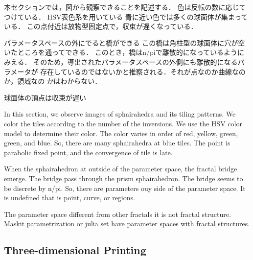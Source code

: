 \documentclass[dvipdfmx]{interact}
\theoremstyle{plain}%
\theoremstyle{definition}
\theoremstyle{remark}
\theoremstyle{problemstyle}
\begin{document}
本セクションでは，図から観察できることを記述する．
色は反転の数に応じてつけている．
HSV表色系を用いている
青に近い色では多くの球面体が集まっている．
この点付近は放物型固定点で，収束が遅くなっている．

パラメータスペースの外にでると橋ができる
この橋は角柱型の球面体に穴が空いたところを通ってできる．
このとき，橋はn/piで離散的になっているようにみえる．
そのため，導出されたパラメータスペースの外側にも離散的になるパラメータが
存在しているのではないかと推察される．それが点なのか曲線なのか，領域なの
かはわからない．

球面体の頂点は収束が遅い

In this section, we observe images of sphairahedra and its tiling
patterns.
We color the tiles according to the number of the inversions.
We use the HSV color model to determine their color.
The color varies in order of red, yellow, green, green, and blue.
So, there are many sphairahedra at blue tiles.
The point is parabolic fixed point, and the convergence of tile is
late.

When the sphairahedron at outside of the parameter space,
the fractal bridge emerge.
The bridge pass through the prism sphairahedron.
The bridge seems to be discrete by n/pi.
So, there are parameters ouy side of the parameter space.
It is undefined that is point, curve, or regions.



The parameter space different from other fractals it is not fractal
structure. Maskit parametrization or julia set have parameter spaces
with fractal structures.

\subsection{Three-dimensional Printing}
\end{document}
